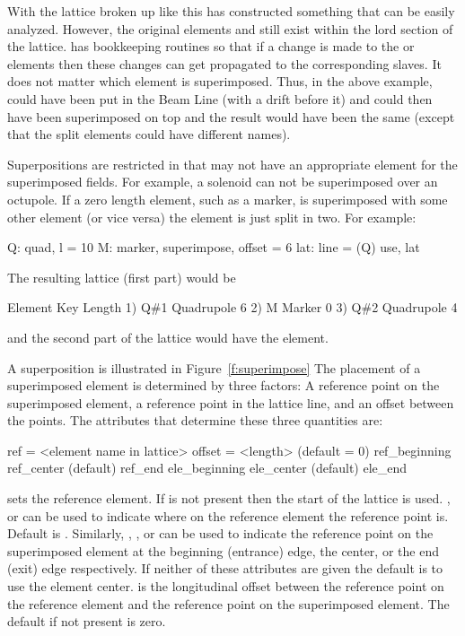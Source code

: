 With the lattice broken up like this \bmad has constructed something
that can be easily analyzed. However, the original elements  and
 still exist within the lord section of the lattice. \bmad has
bookkeeping routines so that if a change is made to the  or
 elements then these changes can get propagated to the
corresponding slaves.  It does not matter which element is
superimposed. Thus, in the above example,  could have been put
in the Beam Line (with a drift before it) and  could then have
been superimposed on top and the result would have been the same
(except that the split elements could have different names).

Superpositions are restricted in that \bmad may not have an
appropriate element for the superimposed fields. For example, a
solenoid can not be superimposed over an octupole.  If a zero length
element, such as a marker, is superimposed with some other element (or
vice versa) the element is just split in two. For example:
\begin{example}
  Q: quad, l = 10
  M: marker, superimpose, offset = 6
  lat: line = (Q)
  use, lat
\end{example}
The resulting lattice (first part) would be
\begin{example}
        Element   Key           Length
  1)    Q{\#}1       Quadrupole    6
  2)    M         Marker        0
  3)    Q{\#}2       Quadrupole    4
\end{example}
and the second part of the lattice would have the  element.
 
A superposition is illustrated in Figure~\ref{f:superimpose} The
placement of a superimposed element is determined by three factors: A
reference point on the superimposed element, a reference point in the
lattice line, and an offset between the points. The attributes that
determine these three quantities are: 
\begin{example}
  ref = <element name in lattice>
  offset = <length>      (default = 0)
  ref_beginning
  ref_center             (default)
  ref_end
  ele_beginning
  ele_center             (default)
  ele_end
\end{example}
 sets the reference element. If  is not present then
the start of the lattice is used. , 
or  can be used to indicate where on the reference element
the reference point is. Default is . Similarly,
, , or  can be used to
indicate the reference point on the superimposed element at the
beginning (entrance) edge, the center, or the end (exit) edge
respectively. If neither of these attributes are given the default is
to use the element center.  is the longitudinal offset
between the reference point on the reference element and the reference
point on the superimposed element. The default if not present is zero.

